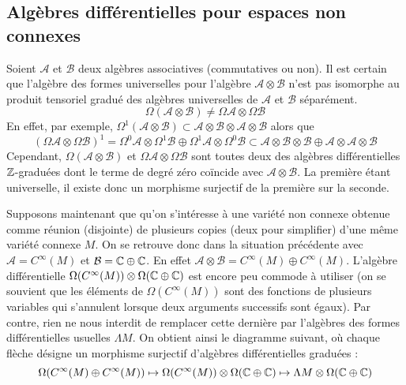 \subsection{Alg\`ebres diff\'erentielles pour espaces non connexes}
Soient ${\mathcal A}$ et ${\mathcal B}$ deux alg\`ebres associatives 
(commutatives ou non). Il est certain que l'alg\`ebre des formes 
universelles pour l'alg\`ebre ${\mathcal A} \otimes {\mathcal B}$  n'est pas 
isomorphe au produit tensoriel gradu\'e des alg\`ebres universelles de  
${\mathcal A}$ et ${\mathcal B}$ s\'epar\'ement. 
$$
\Omega({\mathcal A} \otimes {\mathcal B}) \neq \Omega{\mathcal A} \otimes 
\Omega{\mathcal B}
$$
En effet, par exemple,  $\Omega^{1}({\mathcal A} \otimes {\mathcal B}) 
\subset {\mathcal A} \otimes {\mathcal B} \otimes {\mathcal A} \otimes 
{\mathcal B}$ alors que 
$$
(\Omega{\mathcal A}\otimes\Omega{\mathcal B})^{1} = 
\Omega^{0}{\mathcal A}\otimes \Omega^{1}{\mathcal B} \oplus
\Omega^{1}{\mathcal A}\otimes \Omega^{0}{\mathcal B}
\subset
{\mathcal A} \otimes {\mathcal B}\otimes {\mathcal B} \oplus
{\mathcal A} \otimes {\mathcal A}\otimes {\mathcal B}
$$
Cependant, $\Omega({\mathcal A} \otimes {\mathcal B})$ et $\Omega{\mathcal A} \otimes 
\Omega{\mathcal B}$ sont toutes deux des alg\`ebres diff\'erentielles 
$\mathbb{Z}$-gradu\'ees dont le terme de degr\'e z\'ero co\"incide avec ${\mathcal A} \otimes {\mathcal B}$.
La premi\`ere \'etant universelle, il existe donc un morphisme 
surjectif de la premi\`ere sur la seconde.

Supposons maintenant que qu'on s'int\'eresse \`a une vari\'et\'e non connexe 
obtenue comme r\'eunion (disjointe) de plusieurs copies (deux pour 
simplifier) d'une m\^eme vari\'et\'e connexe $M$. On se retrouve donc dans la 
situation pr\'ec\'edente avec ${\mathcal A} = C^\infty(M)$ et 
${\mathcal B} = \mathbb{C} \oplus \mathbb{C}$. En effet 
${\mathcal A} \otimes {\mathcal B} = C^\infty(M) \oplus C^\infty(M).$
L'alg\`ebre diff\'erentielle $\Omega(C^\infty(M)) \otimes \Omega(\mathbb{C} 
\oplus \mathbb{C})$ est encore peu commode \`a utiliser (on se souvient que 
les \'el\'ements de $\Omega(C^\infty(M))$ sont des fonctions de plusieurs 
variables qui s'annulent lorsque deux arguments successifs sont 
\'egaux). Par contre, rien ne nous interdit de  remplacer cette 
derni\`ere par l'alg\`ebres des formes diff\'erentielles usuelles $\Lambda M$. 
On obtient ainsi le diagramme suivant, o\`u chaque fl\`eche d\'esigne 
un morphisme surjectif d'alg\`ebres diff\'erentielles gradu\'ees :
$$
\Omega(C^\infty(M) \oplus C^\infty(M)) \mapsto \Omega(C^\infty(M)) \otimes \Omega(\mathbb{C} 
\oplus \mathbb{C}) \mapsto \Lambda M \otimes \Omega (\mathbb{C} \oplus \mathbb{C})
$$

